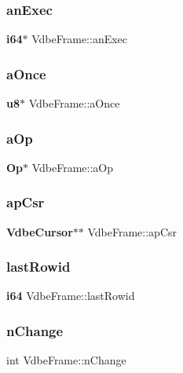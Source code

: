 \mbox{\label{struct_vdbe_frame_aed133c8d63e9c5dd3dedaff47984b467}} 
\subsubsection{anExec}
{\footnotesize\ttfamily \textbf{ i64}$\ast$ Vdbe\+Frame\+::an\+Exec}

\mbox{\label{struct_vdbe_frame_adf0a39294b8e21bf54019e497a04e5c6}} 
\subsubsection{aOnce}
{\footnotesize\ttfamily \textbf{ u8}$\ast$ Vdbe\+Frame\+::a\+Once}

\mbox{\label{struct_vdbe_frame_a0e5670c52e8eeb7e66bf1e3bff8ce2b5}} 
\subsubsection{aOp}
{\footnotesize\ttfamily \textbf{ Op}$\ast$ Vdbe\+Frame\+::a\+Op}

\mbox{\label{struct_vdbe_frame_a5d373b3a195dbd1a31f5aa0dbe1822ee}} 
\subsubsection{apCsr}
{\footnotesize\ttfamily \textbf{ Vdbe\+Cursor}$\ast$$\ast$ Vdbe\+Frame\+::ap\+Csr}

\mbox{\label{struct_vdbe_frame_af655193217fb53c7acab9d24c94344aa}} 
\subsubsection{lastRowid}
{\footnotesize\ttfamily \textbf{ i64} Vdbe\+Frame\+::last\+Rowid}

\mbox{\label{struct_vdbe_frame_a77aacb67d627f4446dd50a795b5a2f0f}} 
\subsubsection{nChange}
{\footnotesize\ttfamily int Vdbe\+Frame\+::n\+Change}


